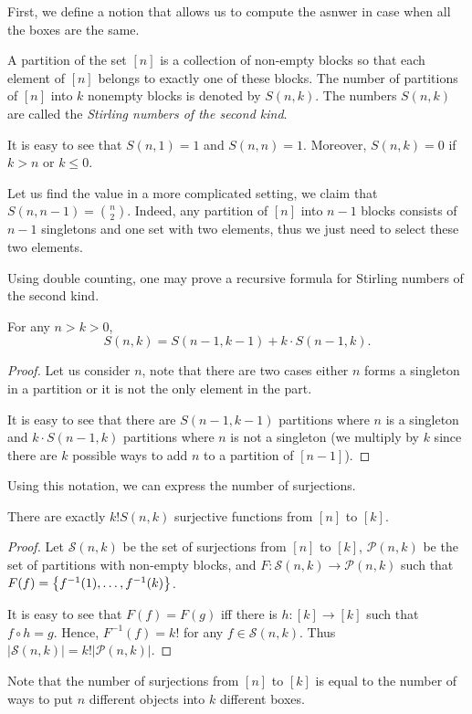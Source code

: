 First, we define a notion that allows us to compute the asnwer in case when
all the boxes are the same.
\begin{definition}
  A partition of the set $[n]$ is a collection of non-empty
  blocks so that each element of $[n]$ belongs to exactly
  one of these blocks. The number of partitions of $[n]$
  into $k$ nonempty blocks is denoted by $S(n, k)$.
  The numbers $S(n, k)$ are called the \emph{Stirling numbers
  of the second kind}.
\end{definition}

It is easy to see that $S(n, 1) = 1$ and $S(n, n) = 1$.
Moreover, $S(n, k) = 0$ if $k > n$ or $k \le 0$.

Let us find the value in a more complicated setting, we
claim that $S(n, n - 1) = \binom{n}{2}$. Indeed, any
partition of $[n]$ into $n - 1$ blocks consists of
$n - 1$ singletons and one set with two elements, thus we
just need to select these two elements.

Using double counting, one may prove a recursive formula
for Stirling numbers of the second kind.
\begin{theorem}
  For any $n > k > 0$,
  \[
    S(n, k) = S(n - 1, k - 1) + k \cdot S(n - 1, k).
  \]
\end{theorem}
\begin{proof}
  Let us consider $n$, note that there are two cases either $n$ forms a
  singleton in a partition or it is not the only element in the part.

  It is easy to see that there are $S(n - 1, k - 1)$ partitions where $n$ is
  a singleton and $k \cdot S(n - 1, k)$ partitions where $n$ is not a singleton
  (we multiply by $k$ since there are $k$ possible ways to add $n$ to a
  partition of $[n - 1]$).
\end{proof}

Using this notation, we can express the number of surjections.
\begin{lemma}
  There are exactly $k! S(n, k)$ surjective functions from
  $[n]$ to $[k]$.
\end{lemma}
\begin{proof}
  Let $\mathcal{S}(n, k)$ be the set of surjections from $[n]$ to $[k]$,
  $\mathcal{P}(n, k)$ be the set of partitions with non-empty blocks, and
  $F : \mathcal{S}(n, k) \to \mathcal{P}(n, k)$ such that
  $F(f) = \set{f^{-1}(1), \dots, f^{-1}(k)}$.

  It is easy to see that $F(f) = F(g)$ iff there is $h : [k] \to [k]$ such that
  $f \circ h = g$. Hence, $F^{-1}(f) = k!$ for any $f \in \mathcal{S}(n, k)$.
  Thus $|\mathcal{S}(n, k)| = k! |\mathcal{P}(n, k)|$.
\end{proof}
Note that the number of surjections from $[n]$ to $[k]$ is equal to the
number of ways to put $n$ different objects into $k$ different boxes.

